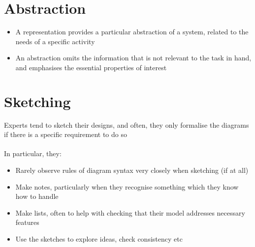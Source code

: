 \documentclass{article}[18pt]
\begin{document}
\section{Abstraction}
\begin{itemize}
	\item A representation provides a particular abstraction of a system, related to the needs of a specific activity
	\item An abstraction omits the information that is not relevant to the task in hand, and emphasises the essential properties of interest
\end{itemize}
\section{Sketching}
Experts tend to sketch their designs, and often, they only formalise the diagrams if there is a specific requirement to do so\\
\\
In particular, they:
\begin{itemize}
	\item Rarely observe rules of diagram syntax very closely when sketching (if at all)
	\item Make notes, particularly when they recognise something which they know how to handle
	\item Make lists, often to help with checking that their model addresses necessary features
	\item Use the sketches to explore ideas, check consistency etc
\end{itemize}
\end{document}
